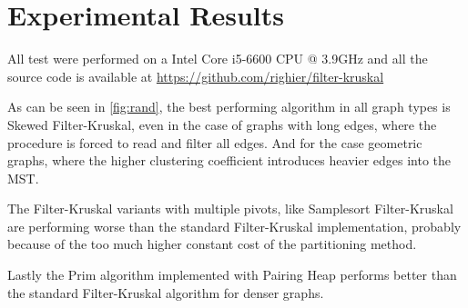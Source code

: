 \documentclass{article}
\begin{document}
\section{Experimental Results}

All test were performed on a Intel Core i5-6600 CPU @ 3.9GHz and all the source code is available at \url{https://github.com/righier/filter-kruskal}

\hspace{1cm}

As can be seen in \autoref{fig:rand}, the best performing algorithm in all graph types is Skewed Filter-Kruskal, even in the case of graphs with long edges, where the procedure is forced to read and filter all edges. And for the case geometric graphs, where the higher clustering coefficient introduces heavier edges into the MST.

The Filter-Kruskal variants with multiple pivots, like Samplesort Filter-Kruskal are performing worse than the standard Filter-Kruskal implementation, probably because of the too much higher constant cost of the partitioning method.

Lastly the Prim algorithm implemented with Pairing Heap performs better than the standard Filter-Kruskal algorithm for denser graphs.
\end{document}
